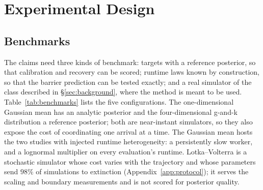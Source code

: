 \documentclass[10pt]{article}
\theoremstyle{plain}
\theoremstyle{definition}
\begin{document}
\section{Experimental Design}\label{sec:experiments}

\subsection{Benchmarks}\label{sec:experiments-suite}
The claims need three kinds of benchmark: targets with a reference posterior, so that calibration and recovery can be scored; runtime laws known by construction, so that the barrier prediction can be tested exactly; and a real simulator of the class described in \S\ref{sec:background}, where the method is meant to be used. Table~\ref{tab:benchmarks} lists the five configurations. The one-dimensional Gaussian mean has an analytic posterior and the four-dimensional g-and-k distribution \citep{rayner2002gk} a reference posterior; both are near-instant simulators, so they also expose the cost of coordinating one arrival at a time. The Gaussian mean hosts the two studies with injected runtime heterogeneity: a persistently slow worker, and a lognormal multiplier on every evaluation's runtime. Lotka--Volterra is a stochastic simulator whose cost varies with the trajectory and whose parameters send $98\%$ of simulations to extinction (Appendix~\ref{app:protocol}); it serves the scaling and boundary measurements and is not scored for posterior quality.
\end{document}
